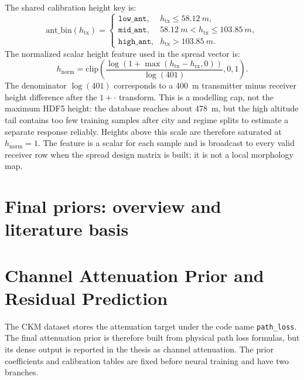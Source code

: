 The shared calibration height key is:
\begin{equation}
\mathrm{ant\_bin}(h_{\mathrm{tx}})=
\begin{cases}
\texttt{low\_ant}, & h_{\mathrm{tx}}\le\SI{58.12}{m},\\
\texttt{mid\_ant}, & \SI{58.12}{m}<h_{\mathrm{tx}}\le\SI{103.85}{m},\\
\texttt{high\_ant}, & h_{\mathrm{tx}}>\SI{103.85}{m}.
\end{cases}
\label{eq:ant_bin_support}
\end{equation}
The normalized scalar height feature used in the spread vector is:
\begin{equation}
  h_{\mathrm{norm}}
  =
  \mathrm{clip}\!\left(
  \frac{\log(1+\max(h_{\mathrm{tx}}-h_{\mathrm{rx}},0))}{\log(401)},
  0,1
  \right).
  \label{eq:h_norm_support}
\end{equation}
The denominator \(\log(401)\) corresponds to a \SI{400}{m} transmitter minus
receiver height difference after the \(1+\cdot\) transform. This is a modelling
cap, not the maximum HDF5 height: the database reaches about \SI{478}{m}, but
the high altitude tail contains too few training samples after city and regime
splits to estimate a separate response reliably. Heights above this scale are
therefore saturated at \(h_{\mathrm{norm}}=1\). The feature is a scalar for
each sample and is broadcast to every valid receiver row when the spread design
matrix is built; it is not a local morphology map.

\section{Final priors: overview and literature basis}
\label{sec:priors_overview}



\section[Channel Attenuation Prior]{Channel Attenuation Prior and Residual Prediction}
\label{sec:path_loss_prior_detail}

The CKM dataset stores the attenuation target under the code name
\texttt{path\_loss}. The final attenuation prior is therefore built from
physical path loss formulas, but its dense output is reported in the thesis as
channel attenuation. The prior coefficients and calibration tables are fixed
before neural training and have two branches.

